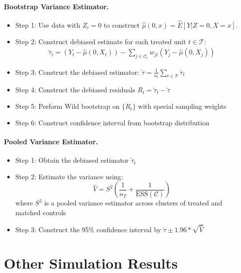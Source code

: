 \documentclass{mytemplate}
\begin{document}
\paragraph{Bootstrap Variance Estimator.}
\begin{itemize}
    \item Step 1: Use data with $Z_i = 0$ to construct $\hat \mu(0, x) = \hat E[Y|Z=0, X=x]$.
    \item Step 2: Construct debiased estimate for each treated unit $t \in \mathcal{T}$:
    \begin{align*}
        \tilde \tau_t = (Y_t - \hat \mu(0, X_t)) - \sum_{j \in \mathcal{C}_t} w_{jt} (Y_j - \hat \mu(0, X_j))
    \end{align*}
    \item Step 3: Construct the debiased estimator: $\tilde \tau = \frac{1}{n_t} \sum_{t \in \mathcal{T}} \tilde \tau_t$ 
    \item Step 4: Construct the debiased residuals $R_t = \tilde \tau_t - \tilde \tau$ 
    \item Step 5: Perform Wild bootstrap on $\{R_t \}$ with special sampling weights
    \item Step 6: Construct confidence interval from bootstrap distribution
\end{itemize}

\paragraph{Pooled Variance Estimator.}
\begin{itemize}
    \item Step 1: Obtain the debiased estimator $\tilde \tau_t$
    \item Step 2: Estimate the variance using:
\begin{equation}
   \hat{V} = S^2 \left( \frac{1}{n_T} + \frac{1}{\text{ESS}(\mathcal{C})} \right)
\end{equation}
    where $S^2$ is a pooled variance estimator across clusters of treated and matched controls
    \item Step 3: Construct the 95\% confidence interval by $\tilde \tau \pm 1.96 * \sqrt{\hat V}$
\end{itemize}


\section{Other Simulation Results}
\label{sec:other-simulation-results}
\end{document}
